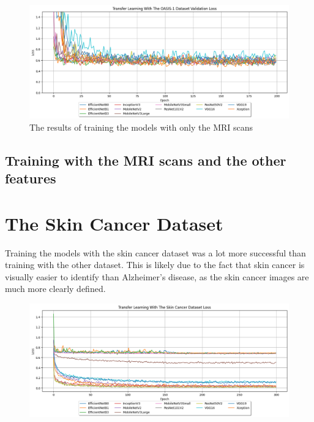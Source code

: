 \documentclass[]{final_report}
\begin{document}
\begin{figure}[ht!]
  \centering
  \includegraphics[width=1\textwidth]{images/OASIS-1-Transfer-Learning-Basic-Results-val-loss.png}
  \caption{The results of training the models with only the MRI scans}
  \label{fig:OASIS-1-Transfer-Learning-Basic-Results-Validation-Loss}
\end{figure}

\subsection{Training with the MRI scans and the other features}

\pagebreak
\section{The Skin Cancer Dataset}
Training the models with the skin cancer dataset was a lot more successful than training with the other dataset. This is likely due to the fact that skin cancer is visually easier to identify than Alzheimer's disease, as the skin cancer images are much more clearly defined.

\begin{figure}[ht!]
  \centering
  \includegraphics[width=1.1\textwidth]{images/skin-cancer-loss.png}
\end{figure}
\end{document}
